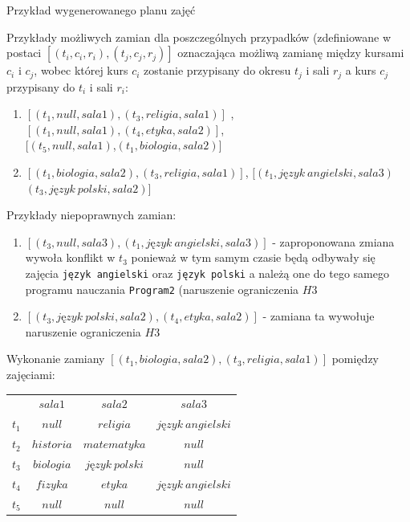 \begin{enumerate}
\begin{table}[H]
\caption {Przykład wygenerowanego planu zajęć}
\end{table} 
Przykłady możliwych zamian dla poszczególnych przypadków (zdefiniowane w postaci $[(t_{i}, c_{i}, r_{i}), (t_{j}, c_{j}, r_{j})]$ oznaczająca możliwą zamianę między kursami $c_{i}$ i $c_{j}$, wobec której kurs $c_{i}$ zostanie przypisany do okresu $t_{j}$ i sali $r_{j}$ a kurs $c_{j}$ przypisany do $t_{i}$ i sali $r_{i}$:
\begin{enumerate}
\item $[(t_{1}, null, sala1),(t_{3},religia, sala1)]$ , $[(t_{1}, null, sala1),(t_{4},etyka, sala2)]$,\\ $[(t_{5}, null, sala1)$,$(t_{1},biologia, sala2)]$ 
\item $[(t_{1}, biologia, sala2),(t_{3},religia, sala1)]$, $[(t_{1}, język\ angielski, sala3)$\\$(t_{3},język\ polski, sala2)]$
\end{enumerate}

Przykłady niepoprawnych zamian:
\begin{enumerate}
\item $[(t_{3}, null, sala3),(t_{1},język\ angielski, sala3)]$ - zaproponowana zmiana wywoła konflikt w $t_{3}$ ponieważ w tym samym czasie będą odbywały się zajęcia \verb#język angielski# oraz \verb#język polski# a należą one do tego samego programu nauczania \verb#Program2# (naruszenie ograniczenia $H3$
\item $[(t_{3}, język\ polski, sala2),(t_{4},etyka, sala2)]$ - zamiana ta wywołuje naruszenie ograniczenia $H3$
\end{enumerate}
Wykonanie zamiany $[(t_{1}, biologia, sala2),(t_{3},religia, sala1)]$ pomiędzy zajęciami:
\begin{table}[H]
\begin{center}
\begin{tabular}{ r|c|c|c| }
\multicolumn{1}{r}{}
 &  \multicolumn{1}{c}{$sala1$}
 & \multicolumn{1}{c}{$sala2$} 
 & \multicolumn{1}{c}{$sala3$} 
 \\
\cline{2-4}
$t_{1}$ & $null$ & $religia$ & $język\ angielski$  \\
\cline{2-4}
$t_{2}$ & $historia$ & $matematyka$  & $null$ \\
\cline{2-4}
$t_{3}$ & $biologia$ & $język\ polski$  & $null$ \\
\cline{2-4}
$t_{4}$ & $fizyka$ & $etyka$ & $język\ angielski$ \\
\cline{2-4}
$t_{5}$ & $null$ & $null$ & $null$ \\
\cline{2-4}
\end{tabular}
\end{center}


\end{table}
\end{enumerate}
